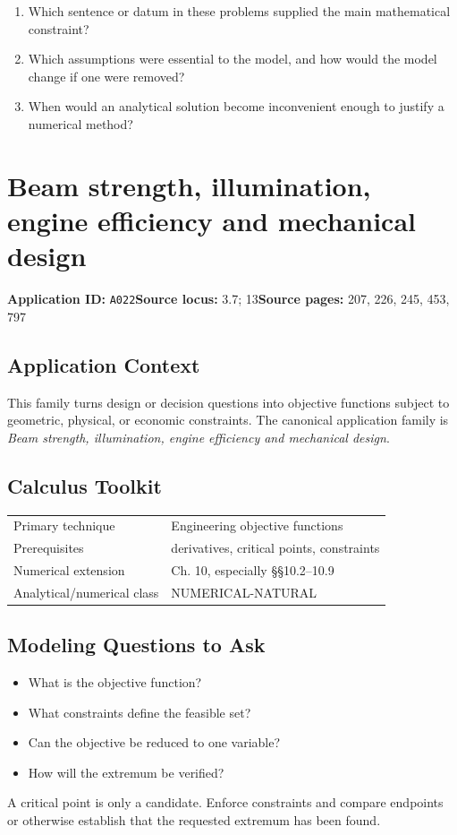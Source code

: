 \documentclass[11pt]{book}
\newcommand{\pid}[1]{\texttt{#1}}
\begin{document}
\begin{reflectionbox}\begin{enumerate}
\item Which sentence or datum in these problems supplied the main mathematical constraint?
\item Which assumptions were essential to the model, and how would the model change if one were removed?
\item When would an analytical solution become inconvenient enough to justify a numerical method?
\end{enumerate}\end{reflectionbox}
\chapter{Beam strength, illumination, engine efficiency and mechanical design}\label{app:A022}
\textbf{Application ID:} \pid{A022}\quad \textbf{Source locus:} 3.7; 13\quad \textbf{Source pages:} 207, 226, 245, 453, 797
\section*{Application Context}
This family turns design or decision questions into objective functions subject to geometric, physical, or economic constraints. The canonical application family is \emph{Beam strength, illumination, engine efficiency and mechanical design}.
\section*{Calculus Toolkit}
\begin{tabularx}{\textwidth}{@{}lX@{}}\toprule
Primary technique & Engineering objective functions \\
Prerequisites & derivatives, critical points, constraints \\
Numerical extension & Ch. 10, especially §§10.2–10.9 \\
Analytical/numerical class & NUMERICAL-NATURAL \\
\bottomrule\end{tabularx}
\section*{Modeling Questions to Ask}\begin{itemize}
\item What is the objective function?
\item What constraints define the feasible set?
\item Can the objective be reduced to one variable?
\item How will the extremum be verified?
\end{itemize}
\begin{errorbox}A critical point is only a candidate. Enforce constraints and compare endpoints or otherwise establish that the requested extremum has been found.\end{errorbox}
\end{document}
